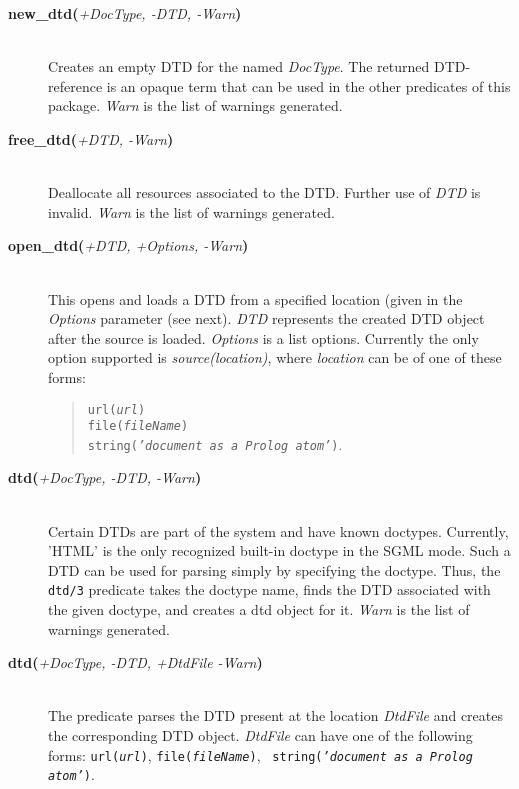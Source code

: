 \begin{description}
\item[{\bf new\_dtd}{\bf (}{\it +DocType, -DTD, -Warn}{\bf )}]\mbox{}\\Creates an empty DTD for the named {\it DocType}. The returned 
  DTD-reference is an opaque term that can be used in the other predicates
  of this package. {\it Warn} is the list of warnings generated.

\item[{\bf free\_dtd}{\bf (}{\it +DTD, -Warn}{\bf )}]\mbox{}\\
  Deallocate all resources associated to the DTD. Further use of {\it DTD}
  is invalid. {\it Warn} is the list of warnings generated.

\item[{\bf open\_dtd}{\bf (}{\it +DTD, +Options, -Warn}{\bf )}]\mbox{}\\
   This opens and loads a DTD from a specified location (given in the
   \emph{Options} parameter (see next).
   {\it DTD} represents the created DTD object after the source is loaded.
   {\it Options} is a list options. Currently the only option supported is
   {\it source(location)}, where {\it location} can be of one of these
   forms:
   \begin{quote}
     {\tt url({\it {url}})}\\
     {\tt file({\it fileName})}\\
     {\tt string({\it 'document as a Prolog atom'})}.
   \end{quote}
 

\item[{\bf dtd}{\bf (}{\it +DocType, -DTD, -Warn}{\bf )}]\mbox{}\\
  Certain DTDs are part of the system and have known
  doctypes. Currently, 'HTML' is the only recognized built-in
  doctype in the SGML mode. 
  Such a DTD can be used for parsing simply by
  specifying the doctype.  Thus, the {\tt dtd/3} predicate takes the
  doctype name, finds the DTD associated with the given doctype, and
  creates a dtd object for it.  {\it Warn} is the list of warnings
  generated.

\item[{\bf dtd}{\bf (}{\it +DocType, -DTD, +DtdFile -Warn}{\bf )}]\mbox{}\\
  
  The predicate parses the DTD present at the location \emph{DtdFile} and
  creates the corresponding DTD object.  {\it DtdFile} can have one of the
  following forms: {\tt url({\it url})}, {\tt file({\it fileName})}, {\tt
    string({\it 'document as a Prolog atom'})}.

\end{description}



